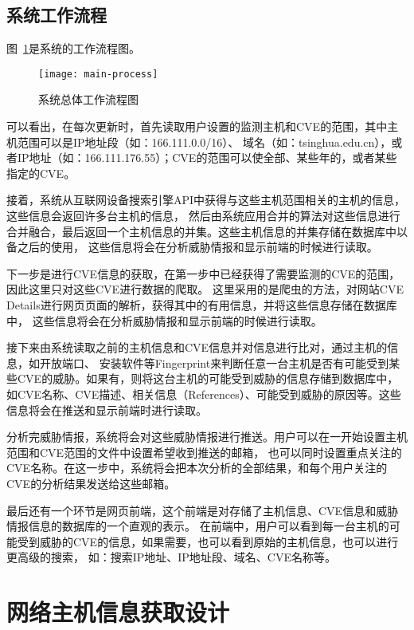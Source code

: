\subsection{系统工作流程}
\label{sec:process}

图~\ref{fig:main-process}是系统的工作流程图。
\begin{figure}[H]
    \centering
    \texttt{[image: main-process]}
    \caption{系统总体工作流程图}
    \label{fig:main-process}
  \end{figure}
可以看出，在每次更新时，首先读取用户设置的监测主机和CVE的范围，其中主机范围可以是IP地址段（如：166.111.0.0/16）、
域名（如：tsinghua.edu.cn），或者IP地址（如：166.111.176.55）；CVE的范围可以使全部、某些年的，或者某些指定的CVE。

接着，系统从互联网设备搜索引擎API中获得与这些主机范围相关的主机的信息，这些信息会返回许多台主机的信息，
然后由系统应用合并的算法对这些信息进行合并融合，最后返回一个主机信息的并集。这些主机信息的并集存储在数据库中以备之后的使用，
这些信息将会在分析威胁情报和显示前端的时候进行读取。

下一步是进行CVE信息的获取，在第一步中已经获得了需要监测的CVE的范围，因此这里只对这些CVE进行数据的爬取。
这里采用的是爬虫的方法，对网站CVE Details进行网页页面的解析，获得其中的有用信息，并将这些信息存储在数据库中，
这些信息将会在分析威胁情报和显示前端的时候进行读取。

接下来由系统读取之前的主机信息和CVE信息并对信息进行比对，通过主机的信息，如开放端口、
安装软件等Fingerprint来判断任意一台主机是否有可能受到某些CVE的威胁。如果有，则将这台主机的可能受到威胁的信息存储到数据库中，
如CVE名称、CVE描述、相关信息（References）、可能受到威胁的原因等。这些信息将会在推送和显示前端时进行读取。

分析完威胁情报，系统将会对这些威胁情报进行推送。用户可以在一开始设置主机范围和CVE范围的文件中设置希望收到推送的邮箱，
也可以同时设置重点关注的CVE名称。在这一步中，系统将会把本次分析的全部结果，和每个用户关注的CVE的分析结果发送给这些邮箱。

最后还有一个环节是网页前端，这个前端是对存储了主机信息、CVE信息和威胁情报信息的数据库的一个直观的表示。
在前端中，用户可以看到每一台主机的可能受到威胁的CVE的信息，如果需要，也可以看到原始的主机信息，也可以进行更高级的搜索，
如：搜索IP地址、IP地址段、域名、CVE名称等。

\section{网络主机信息获取设计}
\label{chap3:hosts-design}

